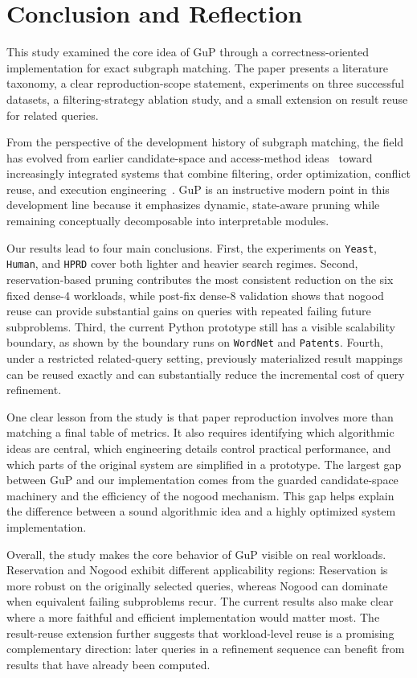 \section{Conclusion and Reflection}
\label{sec:conclusion}

This study examined the core idea of GuP through a correctness-oriented implementation for exact subgraph matching. The paper presents a literature taxonomy, a clear reproduction-scope statement, experiments on three successful datasets, a filtering-strategy ablation study, and a small extension on result reuse for related queries.

From the perspective of the development history of subgraph matching, the field has evolved from earlier candidate-space and access-method ideas~\cite{he2008graphql} toward increasingly integrated systems that combine filtering, order optimization, conflict reuse, and execution engineering~\cite{han2019daf,sun2020study,sun2021rapidmatch}. GuP is an instructive modern point in this development line because it emphasizes dynamic, state-aware pruning while remaining conceptually decomposable into interpretable modules.

Our results lead to four main conclusions. First, the experiments on \texttt{Yeast}, \texttt{Human}, and \texttt{HPRD} cover both lighter and heavier search regimes. Second, reservation-based pruning contributes the most consistent reduction on the six fixed dense-4 workloads, while post-fix dense-8 validation shows that nogood reuse can provide substantial gains on queries with repeated failing future subproblems. Third, the current Python prototype still has a visible scalability boundary, as shown by the boundary runs on \texttt{WordNet} and \texttt{Patents}. Fourth, under a restricted related-query setting, previously materialized result mappings can be reused exactly and can substantially reduce the incremental cost of query refinement.

One clear lesson from the study is that paper reproduction involves more than matching a final table of metrics. It also requires identifying which algorithmic ideas are central, which engineering details control practical performance, and which parts of the original system are simplified in a prototype. The largest gap between GuP and our implementation comes from the guarded candidate-space machinery and the efficiency of the nogood mechanism. This gap helps explain the difference between a sound algorithmic idea and a highly optimized system implementation.

Overall, the study makes the core behavior of GuP visible on real workloads. Reservation and Nogood exhibit different applicability regions: Reservation is more robust on the originally selected queries, whereas Nogood can dominate when equivalent failing subproblems recur. The current results also make clear where a more faithful and efficient implementation would matter most. The result-reuse extension further suggests that workload-level reuse is a promising complementary direction: later queries in a refinement sequence can benefit from results that have already been computed.
